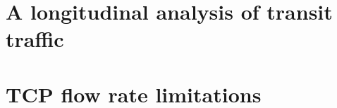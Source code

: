 \chapter{A longitudinal analysis of transit traffic}
\label{chapter:malawi}
\renewcommand{\locfolder}{\chapfolder/malawi}







\chapter{\acs{TCP} flow rate limitations}
\label{chapter:rate}





